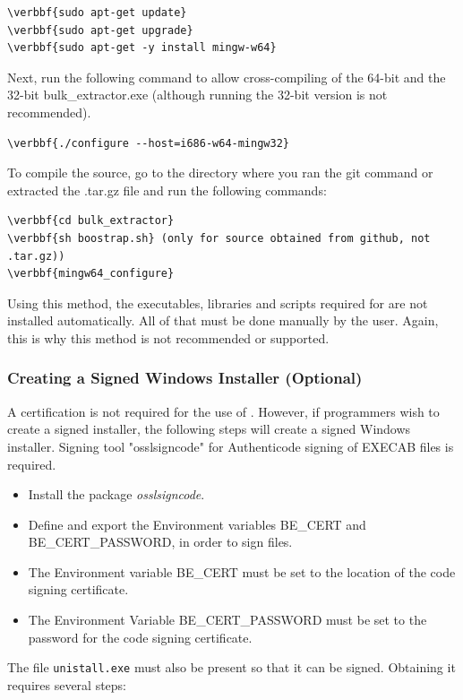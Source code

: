 \documentclass[11pt,fleqn]{article} %
\begin{document}
\begin{Verbatim}[commandchars=\\\{\}] 
\verbbf{sudo apt-get update}
\verbbf{sudo apt-get upgrade}
\verbbf{sudo apt-get -y install mingw-w64}
\end{Verbatim}
Next, run the following command to allow cross-compiling of the 64-bit and the 32-bit bulk\_extractor.exe (although running the 32-bit version is not recommended).
\begin{Verbatim}[commandchars=\\\{\}] 
\verbbf{./configure --host=i686-w64-mingw32}
\end{Verbatim}


To compile the source, go to the \bulk directory where you ran the git command or extracted the .tar.gz file and run the following commands:
\begin{Verbatim}[commandchars=\\\{\}] 
\verbbf{cd bulk_extractor}
\verbbf{sh boostrap.sh} (only for source obtained from github, not .tar.gz))
\verbbf{mingw64_configure}
\end{Verbatim}

Using this method, the executables, libraries and scripts required for \bulk are not installed automatically. All of that must be done manually by the user. Again, this is why this method is not recommended or supported.

\subsubsection{Creating a Signed Windows Installer (Optional)}
A certification is not required for the use of \bulk. However, if programmers wish to create a signed installer, the following steps will create a signed Windows installer. Signing tool "osslsigncode" for Authenticode signing of EXE\/CAB files is required. 
\begin{itemize}
\item Install the package \textit{osslsigncode}. 
\item Define and export the Environment variables BE\_CERT and \\
BE\_CERT\_PASSWORD, in order to sign files. 
\item The Environment variable BE\_CERT must be set to the location of the code signing certificate. 
\item The Environment Variable BE\_CERT\_PASSWORD must be set to the password for the code signing certificate.
\end{itemize}
The file \texttt{unistall.exe} must also be present so that it can be signed. Obtaining it requires several steps:
\end{document}
